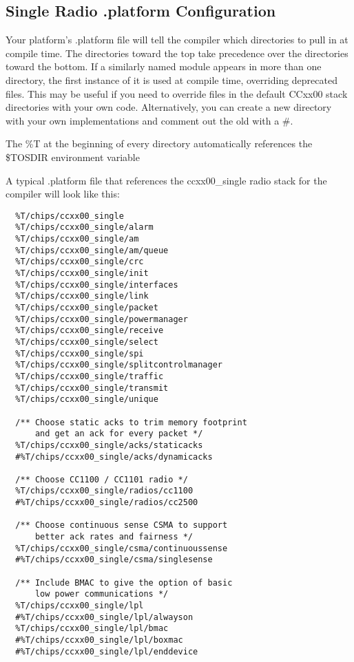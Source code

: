 \documentclass{article}
\begin{document}
\subsection{Single Radio .platform Configuration}
Your platform's .platform file will tell the compiler which directories to pull in at
compile time.  The directories toward the top take precedence over the directories toward
the bottom.  If a similarly named module appears in more than one directory, the first
instance of it is used at compile time, overriding deprecated files. This may be
useful if you need to override files in the default CCxx00 stack directories with your own
code.  Alternatively, you can create a new directory with your own implementations and
comment out the old with a \#.

The \%T at the beginning of every directory automatically references the \$TOSDIR environment variable

A typical .platform file that references the ccxx00\_single radio stack for the compiler will look 
like this:

\begin{verbatim}
  %T/chips/ccxx00_single
  %T/chips/ccxx00_single/alarm
  %T/chips/ccxx00_single/am
  %T/chips/ccxx00_single/am/queue
  %T/chips/ccxx00_single/crc
  %T/chips/ccxx00_single/init
  %T/chips/ccxx00_single/interfaces
  %T/chips/ccxx00_single/link
  %T/chips/ccxx00_single/packet
  %T/chips/ccxx00_single/powermanager
  %T/chips/ccxx00_single/receive
  %T/chips/ccxx00_single/select
  %T/chips/ccxx00_single/spi
  %T/chips/ccxx00_single/splitcontrolmanager
  %T/chips/ccxx00_single/traffic
  %T/chips/ccxx00_single/transmit
  %T/chips/ccxx00_single/unique
  
  /** Choose static acks to trim memory footprint 
      and get an ack for every packet */
  %T/chips/ccxx00_single/acks/staticacks
  #%T/chips/ccxx00_single/acks/dynamicacks
  
  /** Choose CC1100 / CC1101 radio */
  %T/chips/ccxx00_single/radios/cc1100
  #%T/chips/ccxx00_single/radios/cc2500
  
  /** Choose continuous sense CSMA to support 
      better ack rates and fairness */
  %T/chips/ccxx00_single/csma/continuoussense
  #%T/chips/ccxx00_single/csma/singlesense
  
  /** Include BMAC to give the option of basic 
      low power communications */
  %T/chips/ccxx00_single/lpl
  #%T/chips/ccxx00_single/lpl/alwayson
  %T/chips/ccxx00_single/lpl/bmac
  #%T/chips/ccxx00_single/lpl/boxmac
  #%T/chips/ccxx00_single/lpl/enddevice
  
\end{verbatim}
\end{document}
